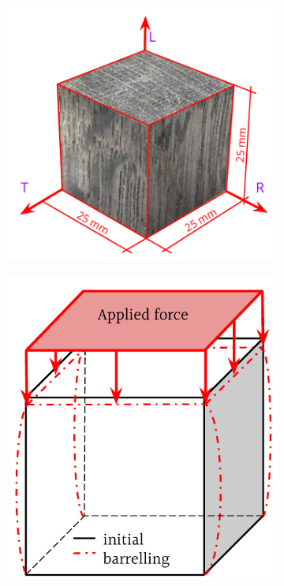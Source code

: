 \documentclass[3p]{elsarticle}
\begin{document}
\begin{figure}
    \centering
    \begin{subfigure}[b]{0.4\textwidth}
        \centering
        \includegraphics[width=\textwidth]{VasaCube.pdf}
        \caption{}
        \label{fig:vasacube}
    \end{subfigure}
    \hfill
    \begin{subfigure}[b]{0.4\textwidth}
        \centering
        \includegraphics[width=\textwidth]{BarellingEffectZoomed.pdf}

\end{subfigure}
\end{figure}
\end{document}
